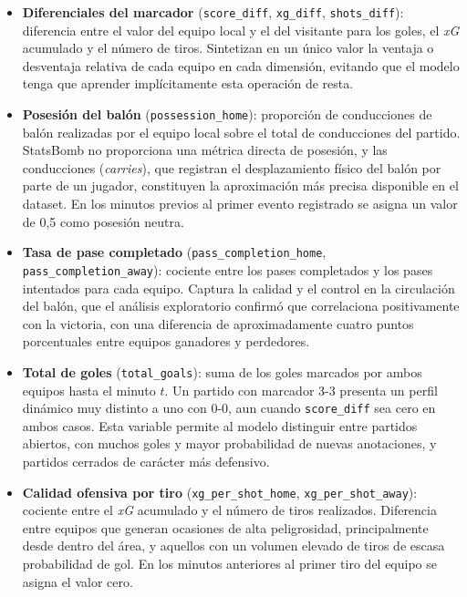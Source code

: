 \begin{itemize}
    \item \textbf{Diferenciales del marcador} (\texttt{score\_diff}, \texttt{xg\_diff}, \texttt{shots\_diff}): diferencia entre el valor del equipo local y el del visitante para los goles, el \textit{xG} acumulado y el número de tiros. Sintetizan en un único valor la ventaja o desventaja relativa de cada equipo en cada dimensión, evitando que el modelo tenga que aprender implícitamente esta operación de resta.

    \item \textbf{Posesión del balón} (\texttt{possession\_home}): proporción de conducciones de balón realizadas por el equipo local sobre el total de conducciones del partido. StatsBomb no proporciona una métrica directa de posesión, y las conducciones (\textit{carries}), que registran el desplazamiento físico del balón por parte de un jugador, constituyen la aproximación más precisa disponible en el dataset. En los minutos previos al primer evento registrado se asigna un valor de 0,5 como posesión neutra.

    \item \textbf{Tasa de pase completado} (\texttt{pass\_completion\_home}, \texttt{pass\_completion\_away}): cociente entre los pases completados y los pases intentados para cada equipo. Captura la calidad y el control en la circulación del balón, que el análisis exploratorio confirmó que correlaciona positivamente con la victoria, con una diferencia de aproximadamente cuatro puntos porcentuales entre equipos ganadores y perdedores.

    \item \textbf{Total de goles} (\texttt{total\_goals}): suma de los goles marcados por ambos equipos hasta el minuto $t$. Un partido con marcador 3-3 presenta un perfil dinámico muy distinto a uno con 0-0, aun cuando \texttt{score\_diff} sea cero en ambos casos. Esta variable permite al modelo distinguir entre partidos abiertos, con muchos goles y mayor probabilidad de nuevas anotaciones, y partidos cerrados de carácter más defensivo.

    \item \textbf{Calidad ofensiva por tiro} (\texttt{xg\_per\_shot\_home}, \texttt{xg\_per\_shot\_away}): cociente entre el \textit{xG} acumulado y el número de tiros realizados. Diferencia entre equipos que generan ocasiones de alta peligrosidad, principalmente desde dentro del área, y aquellos con un volumen elevado de tiros de escasa probabilidad de gol. En los minutos anteriores al primer tiro del equipo se asigna el valor cero.


\end{itemize}
